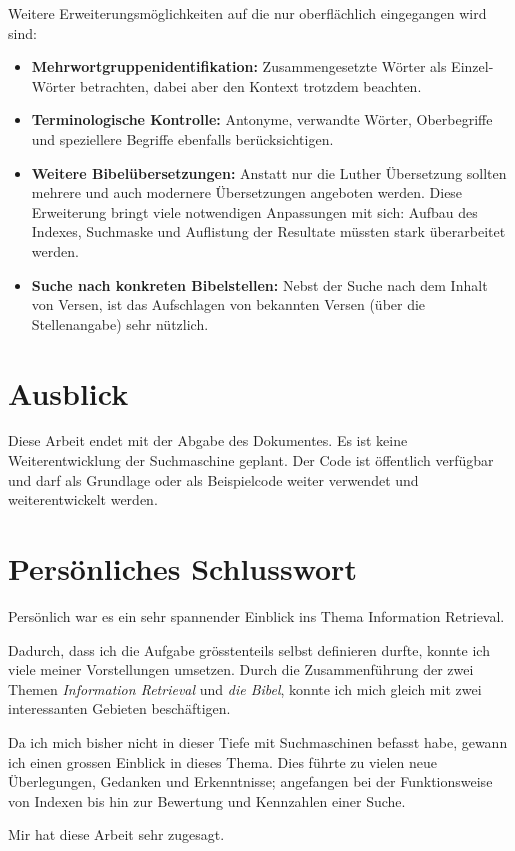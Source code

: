 Weitere Erweiterungsmöglichkeiten auf die nur oberflächlich eingegangen wird sind:
\begin{itemize}[noitemsep]
	\item \textbf{Mehrwortgruppenidentifikation:} Zusammengesetzte Wörter als Einzel-Wörter betrachten, dabei aber den Kontext trotzdem beachten.
	
	\item \textbf{Terminologische Kontrolle:} Antonyme, verwandte Wörter, Oberbegriffe und speziellere Begriffe ebenfalls berücksichtigen.

	\item \textbf{Weitere Bibelübersetzungen:} Anstatt nur die Luther Übersetzung sollten mehrere und auch modernere Übersetzungen angeboten werden. Diese Erweiterung bringt viele notwendigen Anpassungen mit sich: Aufbau des Indexes, Suchmaske und Auflistung der Resultate müssten stark überarbeitet werden.

	\item \textbf{Suche nach konkreten Bibelstellen:} Nebst der Suche nach dem Inhalt von Versen, ist das Aufschlagen von bekannten Versen (über die Stellenangabe) sehr nützlich.
\end{itemize}


\section{Ausblick}
Diese Arbeit endet mit der Abgabe des Dokumentes.
Es ist keine Weiterentwicklung der Suchmaschine geplant. Der Code ist öffentlich verfügbar und darf als Grundlage oder als Beispielcode weiter verwendet und weiterentwickelt werden.


\section{Persönliches Schlusswort}
Persönlich war es ein sehr spannender Einblick ins Thema Information Retrieval.

Dadurch, dass ich die Aufgabe grösstenteils selbst definieren durfte, konnte ich viele meiner Vorstellungen umsetzen.
Durch die Zusammenführung der zwei Themen \textit{Information Retrieval} und \textit{die Bibel}, konnte ich mich gleich mit zwei interessanten Gebieten beschäftigen.

Da ich mich bisher nicht in dieser Tiefe mit Suchmaschinen befasst habe, gewann ich einen grossen Einblick in dieses Thema. Dies führte zu vielen neue Überlegungen, Gedanken und Erkenntnisse; angefangen bei der Funktionsweise von Indexen bis hin zur Bewertung und Kennzahlen einer Suche.

Mir hat diese Arbeit sehr zugesagt.
